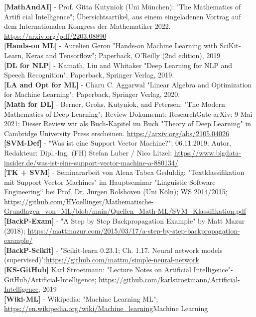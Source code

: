 \documentclass[12pt]{article}
\begin{document}
%
\textbf{[MathAndAI]} - Prof. Gitta Kutyniok (Uni München): "The Mathematics of Artificial Intelligence"; Übersichtsartikel, aus einem eingeladenen Vortrag auf dem Internationalen Kongress der Mathematiker 2022. \url{https://arxiv.org/pdf/2203.08890} \\[0.2cm]
%
\textbf{[Hands-on ML]} - Aurelien Geron "Hands-on Machine Learning with SciKit-Learn, Keras and Tensorflow"; Paperback, O'Reilly (2nd edition), 2019\\[0.2cm] 
%
\textbf{[DL for NLP]} - Kamath, Liu and Whitaker "Deep Learning for NLP and Speech Recognition"; Paperback, Springer Verlag, 2019.\\[0.2cm] 
%
\textbf{[LA and Opt for ML]} - Charu C. Aggarwal "Linear Algebra and Optimization for Machine Learning"; Paperback, Springer Verlag, 2020.\\[0.2cm] 
%
\textbf{[Math for DL]} - Berner, Grohs, Kutyniok, and Petersen: "The Modern Mathematics of Deep Learning"; Review Dokumennt; ResearchGate arXiv: 9 Mai 2021; Dieser Review wir als Buch-Kapitel im Buch  "Theory of Deep Learning" in Cambridge University Press erscheinen. \url{https://arxiv.org/abs/2105.04026} \\[0.2cm] 
%
\textbf{[SVM-Def]} - "Was ist eine Support Vector Machine?"; 06.11.2019; Autor, Redakteur: Dipl.-Ing. (FH) Stefan Luber / Nico Litzel; \url{https://www.bigdata-insider.de/was-ist-eine-support-vector-machine-a-880134/}\\[0.2cm] 
%
\textbf{[TK + SVM]} - Seminararbeit von Alena Tabea Geduldig: "Textklassifikation mit Support Vector Machines" im  Hauptseminar "Linguistic Software Engineering“ bei Prof. Dr. Jürgen Rolshoven (Uni Köln); WS 2014/2015; \url{https://github.com/HVoellinger/Mathematische-Grundlagen_von_ML/blob/main/Quellen_Math-ML/SVM_Klassifikation.pdf}\\[0.2cm] 
%
\textbf{[BackP-Exam]} - "A Step by Step Backpropagation Example" by Matt Mazur (2018); \url{https://mattmazur.com/2015/03/17/a-step-by-step-backpropagation-example/}\\[0.2cm] 
%
\textbf{[BackP-Scikit]} - "Scikit-learn 0.23.1; Ch. 1.17. Neural network models (supervised)";\url{https://github.com/mattm/simple-neural-network}\\[0.2cm] 
%
\textbf{[KS-GitHub]} Karl Stroetmann: "Lecture Notes on Artificial Intelligence"-  GitHub/Artificial-Intelligence; \url{https://github.com/karlstroetmann/Artificial-Intelligence}, 2019\\[0.2cm]  
%
\textbf{[Wiki-ML]} - Wikipedia: "Machine Learning ML"; \url{https://en.wikipedia.org/wiki/Machine_learning}{Machine Learning}\\[0.2cm] 
\end{document}

